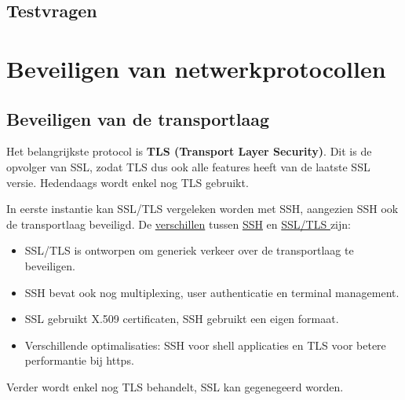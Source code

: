 \documentclass{report}
\begin{document}
	\subsection{Testvragen}



	\section{Beveiligen van netwerkprotocollen}
	\subsection{Beveiligen van de transportlaag}
	Het belangrijkste protocol is \textbf{TLS (Transport Layer Security)}. Dit is de opvolger van SSL, zodat TLS dus ook alle features heeft van de laatste SSL versie. Hedendaags wordt enkel nog TLS gebruikt.


	In eerste instantie kan SSL/TLS vergeleken worden met SSH, aangezien SSH ook de transportlaag beveiligd. De \underline{verschillen} tussen \underline{SSH} en \underline{SSL/TLS } zijn:
	\begin{itemize}
		\item SSL/TLS  is ontworpen om generiek verkeer over de transportlaag te beveiligen.
		\item SSH bevat ook nog multiplexing, user authenticatie en terminal management. 
		\item SSL gebruikt X.509 certificaten, SSH gebruikt een eigen formaat.
		\item Verschillende optimalisaties: SSH voor shell applicaties en TLS voor betere performantie bij https.
	\end{itemize}

	Verder wordt enkel nog TLS behandelt, SSL kan gegenegeerd worden.
\end{document}
